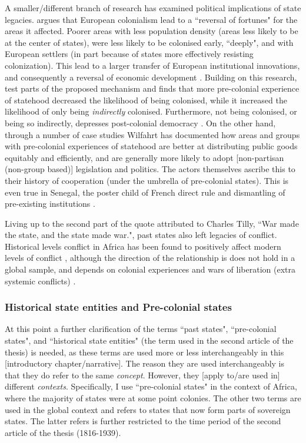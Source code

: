 \documentclass[12pt]{article}
\begin{document}
A smaller/different branch of research has examined political implications of
state legacies. \citet{Acemoglu_2002} argues that European colonialism lead to a
``reversal  of fortunes" for the areas it affected. Poorer areas with less
population density (areas less likely to be at the center of states), were less
likely to be colonised early, ``deeply", and with European settlers (in part
because of states more effectively resisting colonization). This lead to a
larger transfer of European institutional innovations, and consequently a
reversal of economic development \citep{Acemoglu_2002}. Building on this
research, \citet{Hariri2012} test parts of the proposed mechanism and finds that
more pre-colonial experience of statehood decreased the likelihood of being
colonised, while it increased the likelihood of only being \textit{indirectly}
colonised. Furthermore, not being colonised, or being so indirectly, depresses
post-colonial democracy \citep{Hariri2012}. On the other hand, through a number
of case studies Wilfahrt \citeyear{Wilfahrt2018, Wilfahrt_2021} has documented
how areas and groups with pre-colonial experiences of statehood are better at
distributing public goods equitably and efficiently, and are generally more
likely to adopt [non-partisan (non-group based)] legislation and politics. The
actors themselves ascribe this to their history of cooperation (under the
umbrella of pre-colonial states). This is even true in Senegal, the poster child
of French direct rule and dismantling of pre-existing institutions
\citep{Wilfahrt_2021}.

Living up to the second part of the quote attributed to Charles Tilly, ``War
made the state, and the state made war.", past states also left legacies of
conflict. Historical levels conflict in Africa has been found to positively
affect modern levels of conflict \citep{Besley2014}, although the direction of
the relationship is does not hold in a global sample, and depends on colonial
experiences and wars of liberation (extra systemic conflicts)
\citep{Fearon2014}. 

\subsubsection{Historical state entities and Pre-colonial states} 
\label{Historical state entities and Pre-colonial states}

At this point a further clarification of the terms ``past states",
``pre-colonial states", and ``historical state entities" (the term used in the
second article of the thesis) is needed, as these terms are used more or less
interchangeably in this [introductory chapter/narrative]. The reason they are
used interchangeably is that they do refer to the same \textit{concept}.
However, they [apply to/are used in] different \textit{contexts}. Specifically,
I use ``pre-colonial states" in the context of Africa, where the majority of
states were at some point colonies. The other two terms are used in the global
context and refers to states that now form parts of sovereign states. The latter
refers is further restricted to the time period of the second article of the
thesis (1816-1939).
\end{document}
